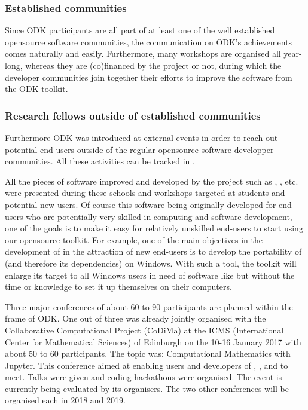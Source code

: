 \documentclass{deliverablereport}
\begin{document}
\subsubsection{Established communities}

Since ODK participants are all part of at least one of the well established opensource software communities, the communication on ODK's achievements comes naturally and easily. Furthermore, many workshops are organised all year-long, whereas they are (co)financed by the project or not, during which the developer communities join together their efforts to improve the software from the ODK toolkit.

\subsubsection{Research fellows outside of established communities}

Furthermore ODK was introduced at external events in order to reach out potential end-users outside of the regular opensource software developper communities.
All these activities can be tracked in .


All the pieces of software improved and developed by the project such as \Sage, \Singular, etc. were presented during these schools and workshops targeted at students and potential new users. Of course this software being originally developed for end-users who are potentially very skilled in computing and software development, one of the goals is to make it easy  for relatively unskilled end-users to start using our opensource toolkit.
For example, one of the main objectives in the development of \Sage in the attraction of new end-users is to develop the portability of \Sage (and therefore its dependencies) on Windows. With such a tool, the toolkit will enlarge its target to all Windows users in need of software like \Sage but without the time or knowledge to set it up themselves on their computers.

Three major conferences of about 60 to 90 participants are planned within the frame of ODK. One out of three was already jointly organised with the Collaborative Computational Project (CoDiMa) at the ICMS (International Center for Mathematical Sciences) of Edinburgh on the 10-16 January 2017 with about 50 to 60 participants. The topic was: Computational Mathematics with Jupyter. This conference aimed at enabling users and developers of \GAP, \Singular, \Sage and \Jupyter to meet. Talks were given and coding hackathons were organised. The event is currently being evaluated by its organisers.
The two other conferences will be organised each in 2018 and 2019.
\end{document}
